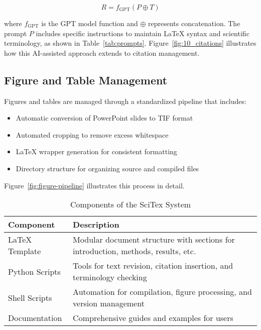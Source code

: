 \begin{equation}
R = f_{\text{GPT}}(P \oplus T)
\end{equation}

where $f_{\text{GPT}}$ is the GPT model function and $\oplus$ represents concatenation. The prompt $P$ includes specific instructions to maintain LaTeX syntax and scientific terminology, as shown in Table~\ref{tab:prompts}. Figure~\ref{fig:10_citations} illustrates how this AI-assisted approach extends to citation management.


\subsection{Figure and Table Management}
\label{subsec:figure-management}

Figures and tables are managed through a standardized pipeline that includes:

\begin{itemize}
    \item Automatic conversion of PowerPoint slides to TIF format
    \item Automated cropping to remove excess whitespace
    \item LaTeX wrapper generation for consistent formatting
    \item Directory structure for organizing source and compiled files
\end{itemize}

Figure~\ref{fig:figure-pipeline} illustrates this process in detail.


\begin{table}[h!]
\centering
\caption{Components of the SciTex System}
\label{tab:components}
\begin{tabular}{lp{8cm}}
\hline
\textbf{Component} & \textbf{Description} \\
\hline
LaTeX Template & Modular document structure with sections for introduction, methods, results, etc. \\
Python Scripts & Tools for text revision, citation insertion, and terminology checking \\
Shell Scripts & Automation for compilation, figure processing, and version management \\
Documentation & Comprehensive guides and examples for users \\
\hline
\end{tabular}
\end{table}

